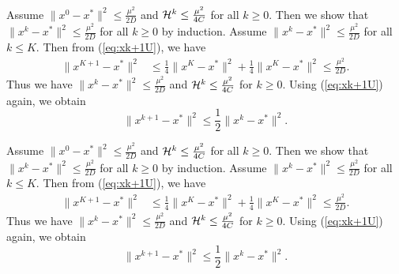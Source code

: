 \documentclass[11pt]{article}
\begin{document}
	Assume $\|x^0-x^*\|^2 \leq \frac{\mu^2}{2D}$ and ${\cal H}^k \leq \frac{\mu^2}{4C}$ for all $k\geq 0$. Then we show that $\|x^k-x^*\|^2 \leq \frac{\mu^2}{2D}$ for all $k\geq 0$ by induction. Assume  $\|x^k-x^*\|^2 \leq \frac{\mu^2}{2D}$ for all $k \leq K$. Then from (\ref{eq:xk+1U}), we have 
	\begin{align*}
		\|x^{K+1} - x^*\|^2 & \leq \frac{1}{4}\|x^K-x^*\|^2 + \frac{1}{4}\|x^K-x^*\|^2 \leq \frac{\mu^2}{2D}. 
	\end{align*} 
	Thus we have $\|x^k-x^*\|^2 \leq \frac{\mu^2}{2D}$ and ${\cal H}^k \leq \frac{\mu^2}{4C}$ for $k\geq 0$. Using (\ref{eq:xk+1U}) again, we obtain 
	\begin{equation}\label{eq:xk+1Ufix}
		\|x^{k+1} - x^*\|^2 \leq \frac{1}{2} \|x^k-x^*\|^2. 
	\end{equation}
	
	Assume $\|x^0-x^*\|^2 \leq \frac{\mu^2}{2D}$ and ${\cal H}^k \leq \frac{\mu^2}{4C}$ for all $k\geq 0$. Then we show that $\|x^k-x^*\|^2 \leq \frac{\mu^2}{2D}$ for all $k\geq 0$ by induction. Assume  $\|x^k-x^*\|^2 \leq \frac{\mu^2}{2D}$ for all $k \leq K$. Then from (\ref{eq:xk+1U}), we have 
	\begin{align*}
		\|x^{K+1} - x^*\|^2 & \leq \frac{1}{4}\|x^K-x^*\|^2 + \frac{1}{4}\|x^K-x^*\|^2 \leq \frac{\mu^2}{2D}. 
	\end{align*} 
	Thus we have $\|x^k-x^*\|^2 \leq \frac{\mu^2}{2D}$ and ${\cal H}^k \leq \frac{\mu^2}{4C}$ for $k\geq 0$. Using (\ref{eq:xk+1U}) again, we obtain 
	\begin{equation}\label{eq:xk+1Ufix}
		\|x^{k+1} - x^*\|^2 \leq \frac{1}{2} \|x^k-x^*\|^2. 
	\end{equation}
	
\end{document}
